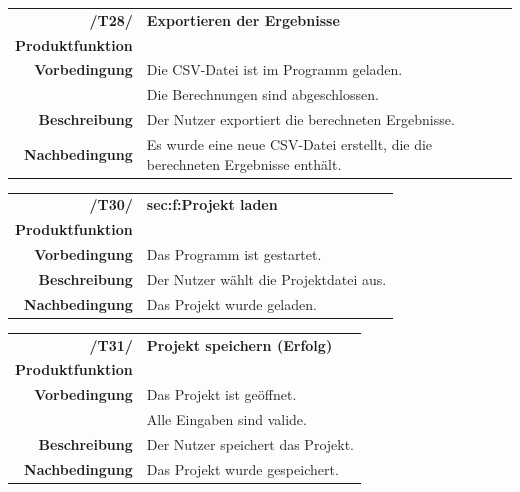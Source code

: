 \documentclass{article}
\begin{document}
\begin{table}[H]
\begin{tabularx}{\textwidth}{rX} \vspace{1mm}
\textbf{/T28/}         & \textbf{Exportieren der Ergebnisse}  \\ \vspace{1mm}
\textbf{Produktfunktion} & \nameref{sec:f:Ergebnisse exportieren} \\
\textbf{Vorbedingung}  & Die CSV-Datei ist im Programm geladen. \\ \vspace{1mm} & Die Berechnungen sind abgeschlossen.   \\ \vspace{1mm}
\textbf{Beschreibung}  & Der Nutzer exportiert die berechneten Ergebnisse. \\
\textbf{Nachbedingung} & Es wurde eine neue CSV-Datei erstellt, die die berechneten Ergebnisse enthält.
\end{tabularx}
\end{table}

\begin{table}[H]
\begin{tabularx}{\textwidth}{rX}
 \vspace{1mm}
\textbf{/T30/}         & \textbf{sec:f:Projekt laden} \\ \vspace{1mm}
\textbf{Produktfunktion} & \nameref{sec:f:Projekt laden} \\ \vspace{1mm}
\textbf{Vorbedingung}  & Das Programm ist gestartet.   \\ \vspace{1mm}
\textbf{Beschreibung}  & Der Nutzer wählt die Projektdatei aus. \\
\textbf{Nachbedingung} & Das Projekt wurde geladen.
\end{tabularx}
\end{table}

\begin{table}[H]
\begin{tabularx}{\textwidth}{rX}
 \vspace{1mm}
\textbf{/T31/}         & \textbf{Projekt speichern (Erfolg)} \\ \vspace{1mm}
\textbf{Produktfunktion} & \nameref{sec:f:Projekt speichern} \\
\textbf{Vorbedingung}  & Das Projekt ist geöffnet.   \\ \vspace{1mm} & Alle Eingaben sind valide. \\ \vspace{1mm}
\textbf{Beschreibung}  & Der Nutzer speichert das Projekt. \\
\textbf{Nachbedingung} & Das Projekt wurde gespeichert.
\end{tabularx}
\end{table}
\end{document}
